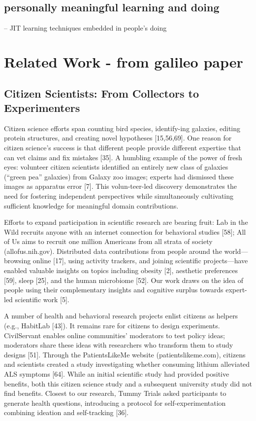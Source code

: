 \subsection{personally meaningful learning and doing}
-- JIT learning techniques embedded in people’s doing


\section{Related Work - from galileo paper}
\subsection{Citizen Scientists: From Collectors to Experimenters}
Citizen science efforts span counting bird species, identify-ing galaxies, editing protein structures, and creating novel hypotheses [15,56,69]. One reason for citizen science’s success is that different people provide different expertise that can vet claims and fix mistakes [35]. A humbling example of the power of fresh eyes: volunteer citizen scientists identified an entirely new class of galaxies (“green pea” galaxies) from Galaxy zoo images; experts had dismissed these images as apparatus error [7]. This volun-teer-led discovery demonstrates the need for fostering independent perspectives while simultaneously cultivating sufficient knowledge for meaningful domain contributions. 

Efforts to expand participation in scientific research are bearing fruit: Lab in the Wild recruits anyone with an internet connection for behavioral studies [58]; All of Us aims to recruit one million Americans from all strata of society (allofus.nih.gov). Distributed data contributions from people around the world—browsing online [17], using activity trackers, and joining scientific projects—have enabled valuable insights on topics including obesity [2], aesthetic preferences [59], sleep [25], and the human microbiome [52]. Our work draws on the idea of people using their complementary insights and cognitive surplus towards expert-led scientific work [5].

A number of health and behavioral research projects enlist citizens as helpers (e.g., HabitLab [43]). It remains rare for citizens to design experiments. CivilServant enables online communities’ moderators to test policy ideas; moderators share these ideas with researchers who transform them to study designs [51]. Through the PatientsLikeMe website (patientslikeme.com), citizens and scientists created a study investigating whether consuming lithium alleviated ALS symptoms [64]. While an initial scientific study had provided positive benefits, both this citizen science study and a subsequent university study did not find benefits. Closest to our research, Tummy Trials asked participants to generate health questions, introducing a protocol for self-experimentation combining ideation and self-tracking [36].

